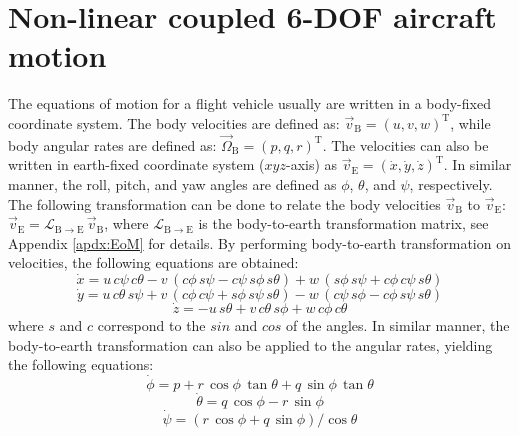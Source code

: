 \documentclass[lettersize,journal]{IEEEtran}
\begin{document}
\section{Non-linear coupled 6-DOF aircraft motion}
The equations of motion for a flight vehicle usually are written in a body-fixed coordinate system. The body velocities are defined as: $\overrightarrow{v}_{\mathrm{B}}=(u,v,w)^\mathrm{T}$, while body angular rates are defined as: $\overrightarrow{\Omega}_{\mathrm{B}}=(p,q,r)^\mathrm{T}$. The velocities can also be written in earth-fixed coordinate system ($xyz$-axis) as $\overrightarrow{v}_{\mathrm{E}}=(\dot{x},\dot{y},\dot{z})^\mathrm{T}$. In similar manner, the roll, pitch, and yaw angles are defined as $\phi$, $\theta$, and $\psi$, respectively. The following transformation can be done to relate the body velocities $\overrightarrow{v}_{\mathrm{B}}$ to $\overrightarrow{v}_{\mathrm{E}}$: $\overrightarrow{v}_{\mathrm{E}}=\mathcal{L}_{\mathrm{B}\rightarrow\mathrm{E}}\,\overrightarrow{v}_{\mathrm{B}}$, where $\mathcal{L}_{\mathrm{B}\rightarrow\mathrm{E}}$ is the body-to-earth transformation matrix, see Appendix \ref{apdx:EoM} for details. By performing body-to-earth transformation on velocities, the following equations are obtained:
\begin{equation}\label{eq:x_dot}
\dot{x}=u\,c\psi\,c\theta-v\,(c\phi\,s\psi-c\psi\,s\phi\,s\theta)+w\,(s\phi\,s\psi+c\phi\,c\psi\,s\theta)
\end{equation}
\begin{equation}\label{eq:y_dot}
\dot{y}=u\,c\theta\,s\psi+v\,(c\phi\,c\psi+s\phi\,s\psi\,s\theta)-w\,(c\psi\,s\phi-c\phi\,s\psi\,s\theta)
\end{equation}
\begin{equation}\label{eq:z_dot}
\dot{z}=-u\,s\theta+v\,c\theta\,s\phi+w\,c\phi\,c\theta
\end{equation}
where $s$ and $c$ correspond to the $sin$ and $cos$ of the angles. In similar manner, the body-to-earth transformation can also be applied to the angular rates, yielding the following equations:
\begin{equation}\label{eq:phi_dot}
\dot{\phi}=p+r\,\cos\phi\,\tan\theta+q\,\sin\phi\,\tan\theta
\end{equation}
\begin{equation}\label{eq:theta_dot}
\dot{\theta}=q\,\cos\phi-r\,\sin\phi
\end{equation}
\begin{equation}\label{eq:psi_dot}
\dot{\psi}=(r\,\cos\phi+q\,\sin\phi)/\cos\theta
\end{equation}
\end{document}
